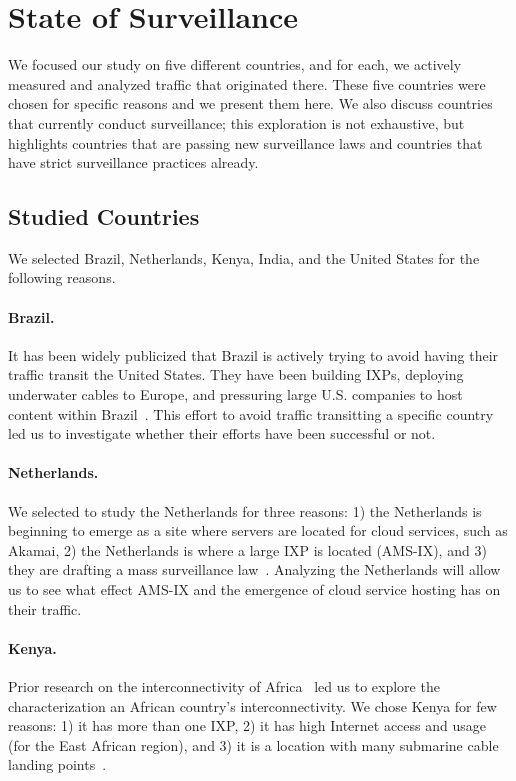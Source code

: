 \section{State of Surveillance}
\label{surv}
We focused our study on five different countries, and for each, we actively measured and analyzed traffic that originated there.  These five countries were chosen for specific reasons and we present them here.  We also discuss countries that currently conduct surveillance; this exploration is not exhaustive, but highlights countries that are passing new surveillance laws and countries that have strict surveillance practices already.   

\subsection{Studied Countries}
We selected Brazil, Netherlands, Kenya, India, and the United States for the following reasons.

\paragraph{Brazil.} It has been widely publicized that Brazil is actively trying to avoid having their traffic transit the United States.  They have been building IXPs, deploying underwater cables to Europe, and pressuring large U.S. companies to host content within Brazil~\cite{brazil_history, brazil_break_from_US, brazil_conference,
  brazil_conference2, brazil_human_rights, brazil_cable, brazil_us_companies, brazil_IXP1}.  This effort to avoid traffic transitting a specific country led us to investigate whether their efforts have been successful or not.

\paragraph{Netherlands.}  We selected to study the Netherlands for three reasons: 1) the Netherlands is beginning to emerge as a site where servers are located for cloud services, such as Akamai, 2) the Netherlands is where a large IXP is located (AMS-IX), and 3) they are drafting a mass surveillance law~\cite{netherlands_surveillance}. Analyzing the Netherlands will allow us to see what effect AMS-IX and the emergence of cloud service hosting has on their traffic.

\paragraph{Kenya.} Prior research on the interconnectivity of Africa~\cite{gupta2014peering, fanou2015diversity} led us to explore the characterization an African country's interconnectivity.  We chose Kenya for few reasons: 1) it has more than one IXP, 2) it has high Internet access and usage (for the East African region), and 3) it is a location with many submarine cable landing points~\cite{kenya_nigeria, teams}.

